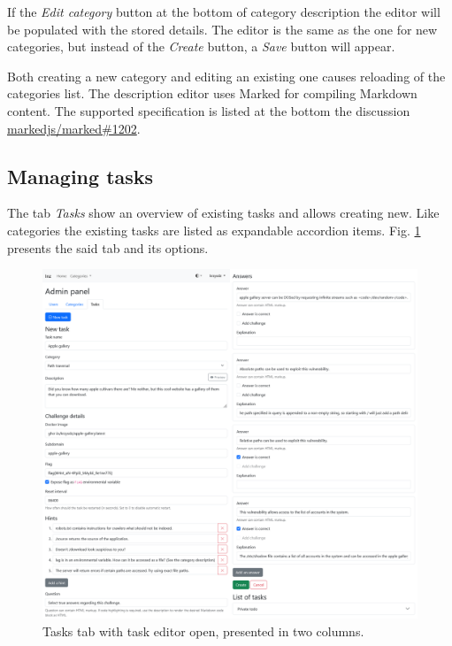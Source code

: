 If the \textit{Edit category} button at the bottom of category description the editor will be populated with the stored details. The editor is the same as the one for new categories, but instead of the \textit{Create} button, a \textit{Save} button will appear.

Both creating a new category and editing an existing one causes reloading of the categories list. The description editor uses Marked for compiling Markdown content. The supported specification is listed at the bottom the discussion \href{https://github.com/markedjs/marked/discussions/1202}{markedjs/marked\#1202}.

\subsection{Managing tasks}
\label{ssec:managing-tasks}

The tab \textit{Tasks} show an overview of existing tasks and allows creating new. Like categories the existing tasks are listed as expandable accordion items. Fig. \ref{fig:manual-admin-add-task} presents the said tab and its options.

\begin{figure}
    \centering
    \includegraphics[width=\textwidth]{img/manual-admin-add-task-2col.png}
    \caption{Tasks tab with task editor open, presented in two columns.}
    \label{fig:manual-admin-add-task}
\end{figure}

